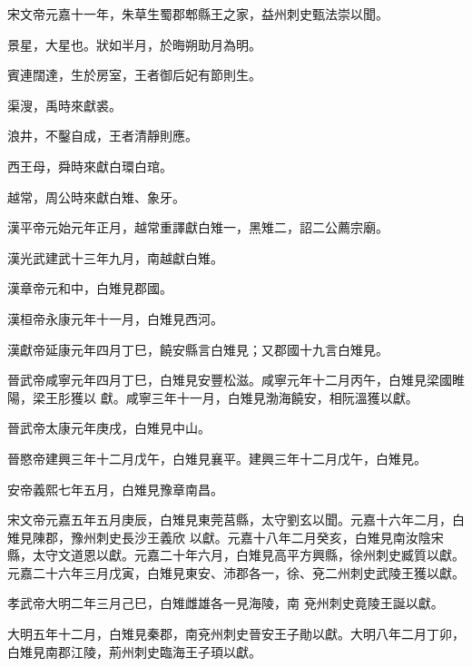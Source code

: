 \begin{pinyinscope}
 宋文帝元嘉十一年，朱草生蜀郡郫縣王之家，益州刺史甄法崇以聞。


景星，大星也。狀如半月，於晦朔助月為明。


賓連闊達，生於房室，王者御后妃有節則生。


渠溲，禹時來獻裘。


浪井，不鑿自成，王者清靜則應。


西王母，舜時來獻白環白琯。


越常，周公時來獻白雉、象牙。



 漢平帝元始元年正月，越常重譯獻白雉一，黑雉二，詔二公薦宗廟。



 漢光武建武十三年九月，南越獻白雉。



 漢章帝元和中，白雉見郡國。



 漢桓帝永康元年十一月，白雉見西河。



 漢獻帝延康元年四月丁巳，饒安縣言白雉見；又郡國十九言白雉見。



 晉武帝咸寧元年四月丁巳，白雉見安豐松滋。咸寧元年十二月丙午，白雉見梁國睢陽，梁王肜獲以
 獻。咸寧三年十一月，白雉見渤海饒安，相阮溫獲以獻。



 晉武帝太康元年庚戌，白雉見中山。



 晉愍帝建興三年十二月戊午，白雉見襄平。建興三年十二月戊午，白雉見。



 安帝義熙七年五月，白雉見豫章南昌。



 宋文帝元嘉五年五月庚辰，白雉見東莞莒縣，太守劉玄以聞。元嘉十六年二月，白雉見陳郡，豫州刺史長沙王義欣
 以獻。元嘉十八年二月癸亥，白雉見南汝陰宋縣，太守文道恩以獻。元嘉二十年六月，白雉見高平方興縣，徐州刺史臧質以獻。元嘉二十六年三月戊寅，白雉見東安、沛郡各一，徐、兗二州刺史武陵王獲以獻。



 孝武帝大明二年三月己巳，白雉雌雄各一見海陵，南
 兗州刺史竟陵王誕以獻。



 大明五年十二月，白雉見秦郡，南兗州刺史晉安王子勛以獻。大明八年二月丁卯，白雉見南郡江陵，荊州刺史臨海王子頊以獻。




\end{pinyinscope}
